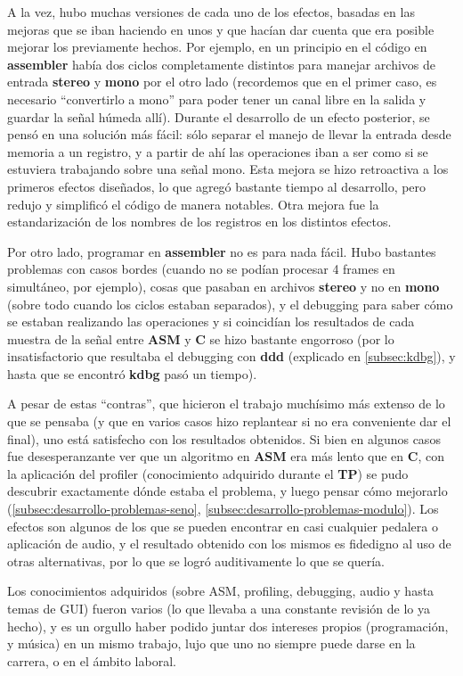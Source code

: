 A la vez, hubo muchas versiones de cada uno de los efectos, basadas en las mejoras que se iban haciendo en unos y que hacían dar cuenta que era posible mejorar los previamente hechos. Por ejemplo, en un principio en el código en \textbf{assembler} había dos ciclos completamente distintos para manejar archivos de entrada \textbf{stereo} y \textbf{mono} por el otro lado (recordemos que en el primer caso, es necesario ``convertirlo a mono'' para poder tener un canal libre en la salida y guardar la señal húmeda allí). Durante el desarrollo de un efecto posterior, se pensó en una solución más fácil: sólo separar el manejo de llevar la entrada desde memoria a un registro, y a partir de ahí las operaciones iban a ser como si se estuviera trabajando sobre una señal mono. Esta mejora se hizo retroactiva a los primeros efectos diseñados, lo que agregó bastante tiempo al desarrollo, pero redujo y simplificó el código de manera notables. Otra mejora fue la estandarización de los nombres de los registros en los distintos efectos.

Por otro lado, programar en \textbf{assembler} no es para nada fácil. Hubo bastantes problemas con casos bordes (cuando no se podían procesar 4 frames en simultáneo, por ejemplo), cosas que pasaban en archivos \textbf{stereo} y no en \textbf{mono} (sobre todo cuando los ciclos estaban separados), y el debugging para saber cómo se estaban realizando las operaciones y si coincidían los resultados de cada muestra de la señal entre \textbf{ASM} y \textbf{C} se hizo bastante engorroso (por lo insatisfactorio que resultaba el debugging con \textbf{ddd} (explicado en \ref{subsec:kdbg}), y hasta que se encontró \textbf{kdbg} pasó un tiempo).\vspace{\baselineskip}

A pesar de estas ``contras'', que hicieron el trabajo muchísimo más extenso de lo que se pensaba (y que en varios casos hizo replantear si no era conveniente dar el final), uno está satisfecho con los resultados obtenidos. Si bien en algunos casos fue desesperanzante ver que un algoritmo en \textbf{ASM} era más lento que en \textbf{C}, con la aplicación del profiler (conocimiento adquirido durante el \textbf{TP}) se pudo descubrir exactamente dónde estaba el problema, y luego pensar cómo mejorarlo (\ref{subsec:desarrollo-problemas-seno}, \ref{subsec:desarrollo-problemas-modulo}). Los efectos son algunos de los que se pueden encontrar en casi cualquier pedalera o aplicación de audio, y el resultado obtenido con los mismos es fidedigno al uso de otras alternativas, por lo que se logró auditivamente lo que se quería.

Los conocimientos adquiridos (sobre ASM, profiling, debugging, audio y hasta temas de GUI) fueron varios (lo que llevaba a una constante revisión de lo ya hecho), y es un orgullo haber podido juntar dos intereses propios (programación, y música) en un mismo trabajo, lujo que uno no siempre puede darse en la carrera, o en el ámbito laboral.